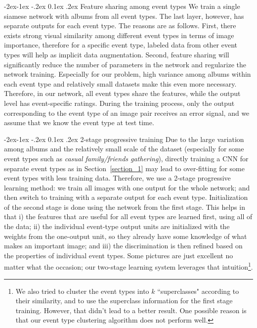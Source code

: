 \documentclass[10pt,twocolumn,letterpaper]{article}
\makeatletter
\renewcommand\subsubsection{\@startsection{subsubsection}{3}{\z@}%
                {-2ex\@plus -1ex \@minus -.2ex}%
                {0.1ex \@plus .2ex}%
                {\normalfont\normalsize\bfseries}}
\makeatother
\begin{document}
\subsubsection{Feature sharing among event types}  
\label{section_1}
We train a single siamese network with albums from all event types. The last layer, however, has separate outputs for each event type. The reasons are as follows. First, there exists strong visual similarity among different event types in terms of image importance, therefore for a specific event type, labeled data from other event types will help as implicit data augmentation. Second, feature sharing will significantly reduce the number of parameters in the network and regularize the network training. Especially for our problem, high variance among albums within each event type and relatively small datasets make this even more necessary. Therefore, in our network, all event types share the features, while the output level has event-specific ratings. During the training process, only the output corresponding to the event type of an image pair receives an error signal, and we assume that we know the event type at test time.

\subsubsection{2-stage progressive training} 
Due to the large variation among albums and the relatively small scale of the dataset (especially for some event types such as \textit{casual family/friends gathering}), directly training a CNN for separate event types as in Section~\ref{section_1} may lead to over-fitting for some event types with less training data. Therefore, we use a 2-stage progressive learning method: we train all images with one output for the whole network; and then switch to training with a separate output for each event type.  Initialization of the second stage is done using the network from the first stage. This helps in that i) the features that are useful for all event types are learned first, using all of the data; ii)  the individual event-type output units are initialized with the weights from the one-output unit, so they already have some knowledge of what makes an important image; and iii) the discrimination is then refined based on the properties of individual event types. Some pictures are just excellent no matter what the occasion; our two-stage learning system leverages that intuition\footnote{We also tried to cluster the event types into $k$ ``superclasses" according to their similarity, and to use the superclass information for the first stage training. However, that didn't lead to a better result. One possible reason is that our event type clustering algorithm does not perform well.}. %
\end{document}
